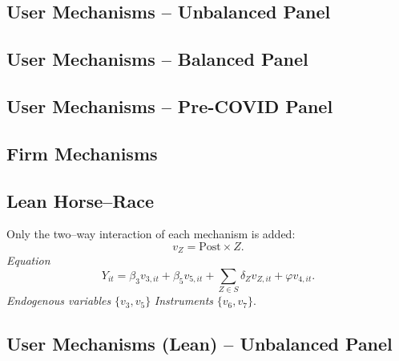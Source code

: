 \documentclass{article}
\newcommand{\cleanedresultsdir}{../../results/cleaned}
\begin{document}
\clearpage
\begin{landscape}
\subsection{User Mechanisms -- Unbalanced Panel}

\end{landscape}

\begin{landscape}
\subsection{User Mechanisms -- Balanced Panel}

\end{landscape}

\begin{landscape}
\subsection{User Mechanisms -- Pre-COVID Panel}

\end{landscape}

\clearpage
\begin{landscape}
\subsection{Firm Mechanisms}

\end{landscape}


\clearpage
\subsection*{Lean Horse–Race}
Only the two–way interaction of each mechanism is added:
\[v_Z = \text{Post}\!\times\! Z.\]
\emph{Equation}
\[Y_{it}=\beta_3 v_{3,it}+\beta_5 v_{5,it}+\sum_{Z\in S}\delta_Z v_{Z,it}+\varphi v_{4,it}.
\]
\emph{Endogenous variables}\; $\{v_3,v_5\}$ \quad\emph{Instruments}\; $\{v_6,v_7\}$.


\clearpage
\begin{landscape}
\subsection{User Mechanisms (Lean) -- Unbalanced Panel}

\end{landscape}
\end{document}
